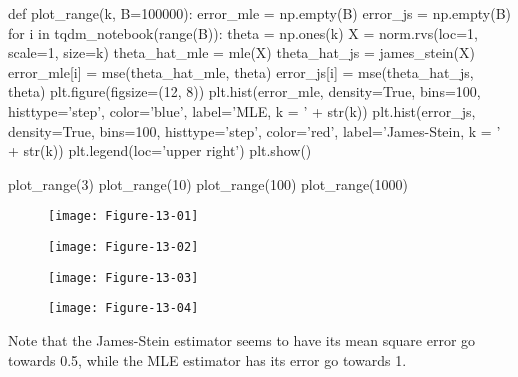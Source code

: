 \begin{python}
def plot_range(k, B=100000):
    error_mle = np.empty(B)
    error_js = np.empty(B)
    for i in tqdm_notebook(range(B)):
        theta = np.ones(k)
        X = norm.rvs(loc=1, scale=1, size=k)
        theta_hat_mle = mle(X)
        theta_hat_js = james_stein(X)
        error_mle[i] = mse(theta_hat_mle, theta)
        error_js[i] = mse(theta_hat_js, theta)
    plt.figure(figsize=(12, 8))
    plt.hist(error_mle, density=True, bins=100, histtype='step', 
             color='blue', label='MLE, k = ' + str(k))
    plt.hist(error_js, density=True, bins=100, histtype='step', 
             color='red', label='James-Stein, k = ' + str(k))
    plt.legend(loc='upper right')
    plt.show()
\end{python}

\begin{python}
plot_range(3)
plot_range(10)
plot_range(100)
plot_range(1000)
\end{python}

\begin{figure}[H]
\centering
\texttt{[image: Figure-13-01]}
\end{figure}

\begin{figure}[H]
\centering
\texttt{[image: Figure-13-02]}
\end{figure}

\begin{figure}[H]
\centering
\texttt{[image: Figure-13-03]}
\end{figure}

\begin{figure}[H]
\centering
\texttt{[image: Figure-13-04]}
\end{figure}

Note that the James-Stein estimator seems to have its mean square error
go towards 0.5, while the MLE estimator has its error go towards 1.

